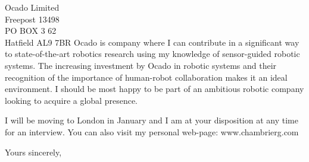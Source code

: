 \documentclass[11pt]{letter} %
\begin{document}
\begin{letter}{Ocado Limited\\ Freepost 13498\\ PO BOX 3 62\\ Hatfield AL9 7BR}
Ocado is company where I can contribute in a significant way to state-of-the-art robotics research using my knowledge of sensor-guided robotic systems. 
The increasing investment by Ocado in robotic systems and their recognition of the importance of human-robot collaboration makes it an ideal environment. 
I should be most happy to be part of an ambitious robotic company looking to acquire a global presence.

I will be moving to London in January and I am at your disposition at any
time for an interview. You can also visit my personal web-page: www.chambrierg.com

\closing{Yours sincerely,}




\end{letter}
\end{document}
